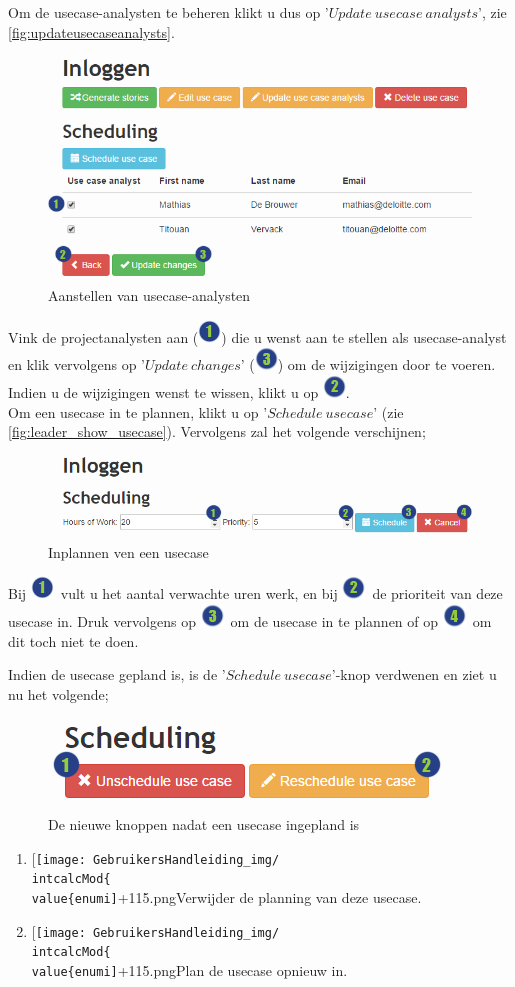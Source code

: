 \documentclass[a4paper,11pt]{article}
\newcommand{\one}{\includegraphics[scale=0.5]{Gebruikershandleiding_img/1.png}}
\newcommand{\two}{\includegraphics[scale=0.5]{Gebruikershandleiding_img/2.png}}
\newcommand{\three}{\includegraphics[scale=0.5]{Gebruikershandleiding_img/3.png}}
\newcommand{\four}{\includegraphics[scale=0.5]{Gebruikershandleiding_img/4.png}}
\newcommand*{\myitem}{
 \item[{\texttt{[image: GebruikersHandleiding\_img/\\intcalcMod\{\\value\{enumi]}+1}{15}.png}}]\stepcounter{enumi}
\begin{document}
Om de usecase-analysten te beheren klikt u dus op '$Update\ usecase\ analysts$', zie \autoref{fig:updateusecaseanalysts}.
\begin{figure}[H]
\centering
\includegraphics[scale=0.5]{Gebruikershandleiding_img/updateusecaseanalysts.png}
\caption{Aanstellen van usecase-analysten}
\label{fig:updateusecaseanalysts}
\end{figure}
Vink de projectanalysten aan (\one) die u wenst aan te stellen als usecase-analyst en klik vervolgens op '$Update\ changes$' (\three) om de wijzigingen door te voeren. Indien u de wijzigingen wenst te wissen, klikt u op \two.\\

Om een usecase in te plannen, klikt u op '$Schedule\ usecase$' (zie \autoref{fig:leader_show_usecase}). Vervolgens zal het volgende verschijnen;
\begin{figure}[H]
\centering
\includegraphics[scale=0.5]{Gebruikershandleiding_img/usecase_scheduling.png}
\caption{Inplannen ven een usecase}
\label{fig:usecase_scheduling}
\end{figure}
Bij \one\ vult u het aantal verwachte uren werk, en bij \two\ de prioriteit van deze usecase in. Druk vervolgens op \three\ om de usecase in te plannen of op \four\ om dit toch niet te doen.

Indien de usecase gepland is, is de '$Schedule\ usecase$'-knop verdwenen en ziet u nu het volgende;
\begin{figure}[H]
\centering
\includegraphics[scale=0.5]{Gebruikershandleiding_img/usecase_scheduled.png}
\caption{De nieuwe knoppen nadat een usecase ingepland is}
\label{fig:usecase_scheduled}
\end{figure}
\begin{enumerate}
\myitem Verwijder de planning van deze usecase.
\myitem Plan de usecase opnieuw in.
\end{enumerate}
\end{document}
